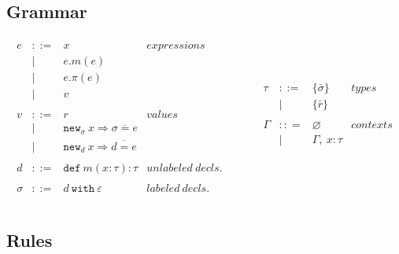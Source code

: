 \documentclass{llncs}
\newcommand{\keywadj}[1]{\mathtt{#1}}
\newcommand{\keyw}[1]{\keywadj{#1}~}
\begin{document}
\subsection{Grammar}

\[
\begin{array}{lll}
\begin{array}{lllr}
	e & ::= & x & expressions \\
  		& | & e.m(e)\\
  		& | & e.\pi(e)\\
		& | & v \\
		&&\\
		
	v & ::= & r & values \\
  		& | & \keywadj{new}_{\sigma}~x \Rightarrow \overline{\sigma = e} \\
  		& | & \keywadj{new}_d~x \Rightarrow \overline{d = e} \\
		&&\\

	d & ::= & \keyw{def} m(x:\tau):\tau & unlabeled~decls.\\		&&\\
		
	\sigma & ::= & d~\keyw{with}\varepsilon  & labeled~ decls.\\
		&&\\
\end{array}
& ~~~~~~
&

\begin{array}{lllr}

	\tau & ::= & \{ \bar \sigma \}  & types \\
		& | & \{ \bar r \} \\
		&&\\

	\Gamma & :: = & \varnothing & contexts\\
		& | & \Gamma,~x : \tau\\
		&&\\

&&\\

\end{array}
\end{array}
\]

\subsection{Rules}

\end{document}
